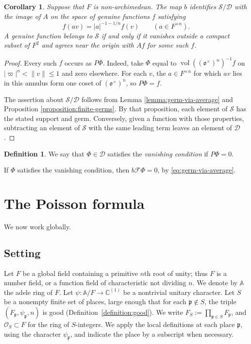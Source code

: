 \documentclass[reqno]{amsart}
\DeclareMathOperator{\vol}{vol}
\theoremstyle{plain}
\newtheorem{corollary}[theorem]{Corollary}
\theoremstyle{definition}
\newtheorem{definition}[theorem]{Definition}
\theoremstyle{itplain}
\numberwithin{equation}{section}
\numberwithin{theorem}{section}
\begin{document}
\begin{corollary}\label{corollary:finite-schwartz}
  Suppose that $F$ is non-archimedean.  The map $b$ identifies $\mathcal{S}/\mathcal{D}$ with the image of $A$ on the space of genuine functions $f$ satisfying
  \begin{equation*}
    f(a v) = \lvert a \rvert^{-1 - 1/n} f(v)
    \qquad (a \in F^{\times n}).
  \end{equation*}
  A genuine function belongs to $\mathcal{S}$ if and only if it vanishes outside a compact subset of $F^2$ and agrees near the origin with $A f$ for some such $f$.
\end{corollary}
\begin{proof}
  Every such $f$ occurs as $P \Phi$.  Indeed, take $\Phi$ equal to $\vol((\mathfrak{o}^\times)^n)^{-1} f$ on $\lvert \varpi \rvert^n < \lVert v \rVert \leq 1$ and zero elsewhere.  For each $v$, the $a \in F^{\times n}$ for which $a v$ lies in this annulus form one coset of $(\mathfrak{o}^\times)^n$, so $P \Phi = f$.

  The assertion about $\mathcal{S}/\mathcal{D}$ follows from Lemma \ref{lemma:germ-via-average} and Proposition \ref{proposition:finite-germs}.  By that proposition, each element of $\mathcal{S}$ has the stated support and germ.  Conversely, given a function with those properties, subtracting an element of $\mathcal{S}$ with the same leading term leaves an element of $\mathcal{D}$.
\end{proof}

\begin{definition}\label{definition:genuine-vanishing}
  We say that $\Phi \in \mathcal{D}$ satisfies the \emph{vanishing condition} if $P \Phi = 0$.
\end{definition}
If $\Phi$ satisfies the vanishing condition, then $b \mathcal{F} \Phi = 0$, by \eqref{eq:germ-via-average}.

\section{The Poisson formula}\label{sec:poisson}
We now work globally.

\subsection{Setting}\label{sec:main-formula}
Let $F$ be a global field containing a primitive $n$th root of unity; thus $F$ is a number field, or a function field of characteristic not dividing $n$.  We denote by $\mathbb{A}$ the adele ring of $F$.  Let $\psi : \mathbb{A} / F \rightarrow \mathbb{C}^{(1)}$ be a nontrivial unitary character.  Let $S$ be a nonempty finite set of places, large enough that for each $\mathfrak{p} \notin S$, the triple $(F_{\mathfrak{p}}, \psi_{\mathfrak{p}}, n)$ is good (Definition~\ref{definition:good}).  We write $F_S := \prod_{\mathfrak{p} \in S} F_{\mathfrak{p}}$, and $\mathcal{O}_S \subset F$ for the ring of $S$-integers.  We apply the local definitions at each place $\mathfrak{p}$, using the character $\psi_{\mathfrak{p}}$, and indicate the place by a subscript when necessary.
\end{document}

